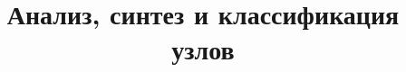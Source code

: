 \documentclass[a4paper]{scrbook}
\begin{document}
\title{Анализ, синтез и классификация узлов}

\stealcurrent
\end{document}
